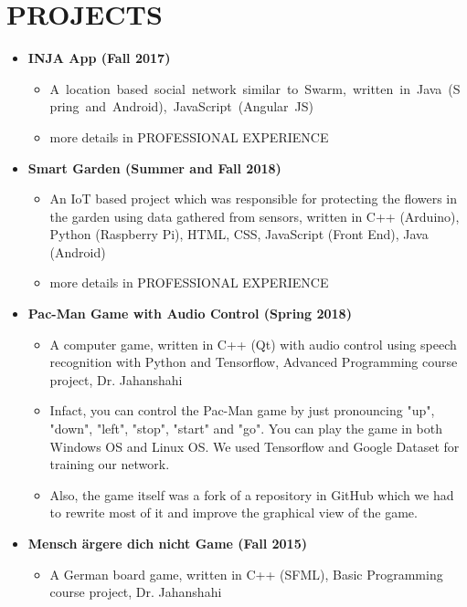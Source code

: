 \section{PROJECTS}
\begin{itemize}
	\item \textbf{INJA App (Fall 2017)} 
		\begin{itemize}
		\item \mbox{A location based social network similar to Swarm, written in Java (Spring and Android),
				JavaScript (Angular JS)}
		\item more details in PROFESSIONAL EXPERIENCE
		\end{itemize}
	
	\vspace{+1 em}
	\item \textbf{Smart Garden (Summer and Fall 2018)} 
		\begin{itemize}
			\item An IoT based project which was responsible for protecting the flowers in the garden using data gathered from sensors, written in C++ (Arduino), Python (Raspberry Pi), HTML, CSS, JavaScript (Front End), Java (Android)
			\item more details in PROFESSIONAL EXPERIENCE
		\end{itemize}	
	
	\vspace{+1 em}
	\item \textbf{Pac-Man Game with Audio Control (Spring 2018)} 
		\begin{itemize}
			\item A computer game, written in C++ (Qt) with audio control using speech recognition with Python and Tensorflow, Advanced Programming course project, Dr. Jahanshahi
\item Infact, you can control the Pac-Man game by just pronouncing "up", "down", "left", "stop", "start" and "go". You can play the game in both Windows OS and Linux OS.
We used Tensorflow and Google Dataset for training our network. 
\item Also, the game itself was a fork of a repository in GitHub which we had to rewrite most of it and improve the graphical view of the game.
		\end{itemize}	
	
	\vspace{+1 em}
	\item \textbf{Mensch ärgere dich nicht Game (Fall 2015)} 
		\begin{itemize}
			\item A German board game, written in C++ (SFML), Basic Programming course project, Dr. Jahanshahi
		\end{itemize}


\end{itemize}
